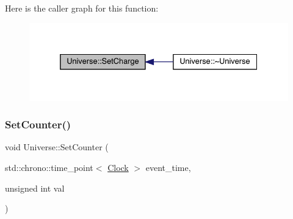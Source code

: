 Here is the caller graph for this function\+:
\nopagebreak
\begin{figure}[H]
\begin{center}
\leavevmode
\includegraphics[width=332pt]{class_universe_a3b3da7c86a7b75e5e5c0b7972ac82a87_icgraph}
\end{center}
\end{figure}
\mbox{\label{class_universe_aa22202ae740eb1355529afcb13285e91}} 
\subsubsection{\texorpdfstring{Set\+Counter()}{SetCounter()}}
{\footnotesize\ttfamily void Universe\+::\+Set\+Counter (\begin{DoxyParamCaption}\item[{std\+::chrono\+::time\+\_\+point$<$ \hyperlink{universe_8h_a0ef8d951d1ca5ab3cfaf7ab4c7a6fd80}{Clock} $>$}]{event\+\_\+time,  }\item[{unsigned int}]{val }\end{DoxyParamCaption})\hspace{0.3cm}{\ttfamily [virtual]}}



